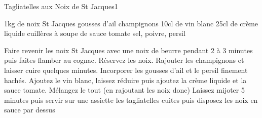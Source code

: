 \begin{recette}{Tagliatelles aux Noix de St Jacques}{1}{}{}
\begin{ingredients}
\ingredient 1kg de noix St Jacques
 gousses d'ail
 champignons
\ingredient 10cl de vin blanc
\ingredient 25cl de crème liquide
 cuillères à soupe de sauce tomate
\ingredient sel, poivre, persil
\end{ingredients}

\begin{preparation}
\etape Faire revenir les noix St Jacques avec une noix de beurre pendant 2 à 3 minutes puis faites flamber au cognac. Réservez les noix.
\etape Rajouter les champignons et laisser cuire quelques minutes. Incorporer les gousses d'ail et le persil finement hachés.
\etape Ajoutez le vin blanc, laissez réduire puis ajoutez la crème liquide et la sauce tomate. Mélangez le tout (en rajoutant les noix donc)
\etape Laissez mijoter 5 minutes puis servir sur une assiette les tagliatelles cuites puis disposez les noix en sauce par dessus
\end{preparation}

\end{recette}

